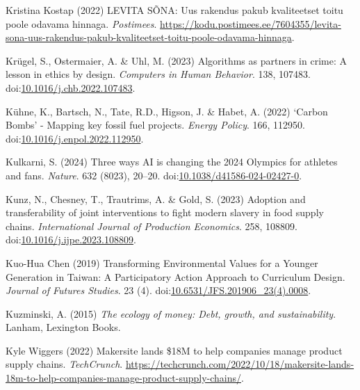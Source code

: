 \documentclass[
  letterpaper,
  DIV=11,
  numbers=noendperiod]{scrartcl}
\newlength{\cslhangindent}
\newenvironment{CSLReferences}[2] %
 {\begin{list}{}{%
  \setlength{\itemindent}{0pt}
  \setlength{\leftmargin}{0pt}
  \setlength{\parsep}{0pt}
  \ifodd #1
   \setlength{\leftmargin}{\cslhangindent}
   \setlength{\itemindent}{-1\cslhangindent}
  \fi
  \setlength{\itemsep}{#2\baselineskip}}}
 {\end{list}}
\begin{document}
\begin{CSLReferences}{0}{1}
Kristina Kostap (2022) {LEVITA S{Õ}NA: Uus rakendus pakub kvaliteetset
toitu poole odavama hinnaga}. \emph{Postimees}.
\url{https://kodu.postimees.ee/7604355/levita-sona-uus-rakendus-pakub-kvaliteetset-toitu-poole-odavama-hinnaga}.

Krügel, S., Ostermaier, A. \& Uhl, M. (2023) Algorithms as partners in
crime: {A} lesson in ethics by design. \emph{Computers in Human
Behavior}. 138, 107483.
doi:\href{https://doi.org/10.1016/j.chb.2022.107483}{10.1016/j.chb.2022.107483}.

Kühne, K., Bartsch, N., Tate, R.D., Higson, J. \& Habet, A. (2022)
{`{Carbon Bombs}'} - {Mapping} key fossil fuel projects. \emph{Energy
Policy}. 166, 112950.
doi:\href{https://doi.org/10.1016/j.enpol.2022.112950}{10.1016/j.enpol.2022.112950}.

Kulkarni, S. (2024) Three ways {AI} is changing the 2024 {Olympics} for
athletes and fans. \emph{Nature}. 632 (8023), 20--20.
doi:\href{https://doi.org/10.1038/d41586-024-02427-0}{10.1038/d41586-024-02427-0}.

Kunz, N., Chesney, T., Trautrims, A. \& Gold, S. (2023) Adoption and
transferability of joint interventions to fight modern slavery in food
supply chains. \emph{International Journal of Production Economics}.
258, 108809.
doi:\href{https://doi.org/10.1016/j.ijpe.2023.108809}{10.1016/j.ijpe.2023.108809}.

Kuo-Hua Chen (2019) Transforming {Environmental Values} for a {Younger
Generation} in {Taiwan}: {A Participatory Action Approach} to
{Curriculum Design}. \emph{Journal of Futures Studies}. 23 (4).
doi:\href{https://doi.org/10.6531/JFS.201906_23(4).0008}{10.6531/JFS.201906\_23(4).0008}.

Kuzminski, A. (2015) \emph{The ecology of money: Debt, growth, and
sustainability}. Lanham, Lexington Books.

Kyle Wiggers (2022) Makersite lands \${18M} to help companies manage
product supply chains. \emph{TechCrunch}.
\url{https://techcrunch.com/2022/10/18/makersite-lands-18m-to-help-companies-manage-product-supply-chains/}.


\end{CSLReferences}
\end{document}

